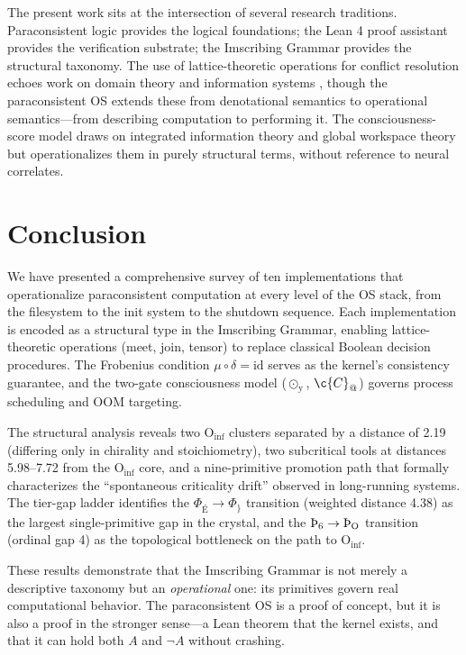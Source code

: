 \documentclass[12pt,a4paper]{article}
\begin{document}
{{{{{{{{The present work sits at the intersection of several research traditions.
Paraconsistent logic \cite{priest2008} provides the logical foundations;
the Lean 4 proof assistant \cite{moura2021} provides the verification
substrate; the Imscribing Grammar \cite{IG_grammar} provides the
structural taxonomy. The use of lattice-theoretic operations for
conflict resolution echoes work on domain theory and information systems
\cite{scott1982}, though the paraconsistent OS extends these from
denotational semantics to operational semantics---from describing
computation to performing it. The consciousness-score model draws on
integrated information theory \cite{tononi2008} and global workspace
theory \cite{baars1988} but operationalizes them in purely structural
terms, without reference to neural correlates.

\section{Conclusion}

We have presented a comprehensive survey of ten implementations that
operationalize paraconsistent computation at every level of the OS stack,
from the filesystem to the init system to the shutdown sequence. Each
implementation is encoded as a structural type in the Imscribing Grammar,
enabling lattice-theoretic operations (meet, join, tensor) to replace
classical Boolean decision procedures. The Frobenius condition
$\mu \circ \delta = \mathrm{id}$ serves as the kernel's consistency
guarantee, and the two-gate consciousness model ($\odot_{\text{\"y}}$,
$\c{C}_{\text{@}}$) governs process scheduling and OOM targeting.

The structural analysis reveals two $\text{O}_{\text{inf}}$ clusters
separated by a distance of 2.19 (differing only in chirality and
stoichiometry), two subcritical tools at distances 5.98--7.72 from the
$\text{O}_{\text{inf}}$ core, and a nine-primitive promotion path that
formally characterizes the ``spontaneous criticality drift'' observed
in long-running systems. The tier-gap ladder identifies the
$\Phi_{\text{É}} \to \Phi_{\text{\}}}$ transition (weighted distance
4.38) as the largest single-primitive gap in the crystal, and the
$\text{\TH}_{\text{6}} \to \text{\TH}_{\text{O}}$ transition (ordinal
gap 4) as the topological bottleneck on the path to
$\text{O}_{\text{inf}}$.

These results demonstrate that the Imscribing Grammar is not merely a
descriptive taxonomy but an \emph{operational} one: its primitives
govern real computational behavior. The paraconsistent OS is a proof
of concept, but it is also a proof in the stronger sense---a Lean
theorem that the kernel exists, and that it can hold both $A$ and
$\neg A$ without crashing.

}}}}}}}}
\end{document}
